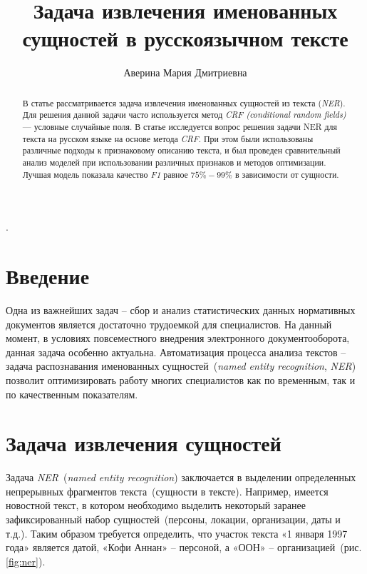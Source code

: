 \documentclass{csmathnotes}
\title{Задача извлечения именованных сущностей в русскоязычном тексте}
\author{Аверина Мария Дмитриевна}
\affiliation{Ярославский государственный университет им. П.\,Г. Демидова}
\begin{document}
\maketitle

\begin{abstract}
В статье рассматривается задача извлечения именованных сущностей из текста (\emph{NER}).
Для решения данной задачи часто используется метод \emph{CRF (conditional random fields)} --- условные случайные поля.
В статье исследуется вопрос решения задачи NER для текста на русском языке на основе метода \emph{CRF}.
При этом были использованы различные подходы к признаковому описанию текста, 
и был проведен сравнительный анализ моделей при использовании различных признаков и методов оптимизации.
Лучшая модель показала качество \emph{F1} равное $75\%-99\%$ в зависимости от сущности.
\end{abstract}

.

\section*{Введение}
Одна из важнейших задач – сбор и анализ статистических данных нормативных
документов является достаточно трудоемкой для специалистов. На данный момент, в условиях повсеместного внедрения электронного документооборота, данная задача особенно актуальна. Автоматизация процесса анализа текстов – задача распознавания именованных сущностей~(\emph{named entity recognition}, \emph{NER})~\cite{base} позволит оптимизировать работу многих специалистов как по временным, так и по качественным показателям.


\section*{Задача извлечения сущностей}

Задача \emph{NER}~(\emph{named entity recognition}) заключается в выделении определенных непрерывных фрагментов текста~(сущности в тексте). Например, имеется новостной текст, в котором необходимо выделить некоторый заранее зафиксированный набор сущностей~(персоны, локации, организации, даты и т.д.). Таким образом требуется определить, что участок текста «1 января 1997 года» является датой, «Кофи Аннан» – персоной, а «ООН» – организацией~(рис. \ref{fig:ner}).
\end{document}

